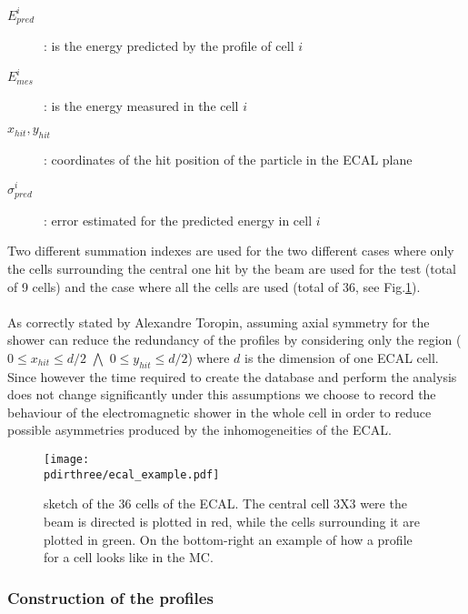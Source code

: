 \begin{description}
\item[$E_{pred}^i$]: is the energy predicted by the profile of cell
  $i$
\item[$E_{mes}^i$]: is the energy measured in the cell $i$
\item[$x_{hit},y_{hit}$]: coordinates of the hit position of the
  particle in the ECAL plane
\item [$\sigma^{i}_{pred}$]: error estimated for the predicted energy
  in cell $i$
\end{description}


Two different summation indexes are used for the two different cases
where only the cells surrounding the central one hit by the beam are
used for the test (total of 9 cells) and the case where all the cells
are used (total of 36, see Fig.\ref{fig:ecal_example}).
\\
\\
As correctly stated by Alexandre Toropin, assuming axial symmetry for
the shower can reduce the redundancy of the profiles by considering
only the region ($0 \leq x_{hit} \leq d/2$ $\bigwedge$
$0 \leq y_{hit} \leq d/2$) where $d$ is the dimension of one ECAL
cell. Since however the time required to create the database and
perform the analysis does not change significantly under this
assumptions we choose to record the behaviour of the electromagnetic
shower in the whole cell in order to reduce possible asymmetries
produced by the inhomogeneities of the ECAL.

\begin{figure}[h!]
  \begin{center}
    \texttt{[image: \\pdirthree/ecal\_example.pdf]}
  \end{center}
  \caption[ECAL sketch]{sketch of the 36 cells of the ECAL. The central cell 3X3
    were the beam is directed is plotted in red, while the cells
    surrounding it are plotted in green. On the bottom-right an
    example of how a profile for a cell looks like in the MC.}
  \label{fig:ecal_example}
\end{figure}


 
\subsubsection{Construction of the profiles}
\label{ch3:sec:make_profile}

